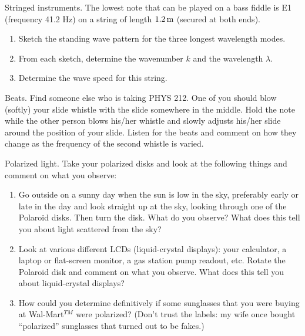 \begin{aproblem}{Stringed instruments.} 
  The lowest note that can be played on a bass fiddle is E1 (frequency
  41.2 Hz) on a string of length $1.2\,\mbox{m}$ (secured at both
  ends).
  \begin{enumerate}
  \item Sketch the standing wave pattern for the three longest
    wavelength modes.
  \item From each sketch, determine the wavenumber $k$ and the
    wavelength $\lambda$.
  \item Determine the wave speed for this string.
  \end{enumerate}
\end{aproblem}

\begin{aproblem}{Beats.}  
  Find someone else who is taking PHYS 212. One of you should blow
  (softly) your slide whistle with the slide somewhere in the
  middle. Hold the note while the other person blows his/her whistle
  and slowly adjusts his/her slide around the position of your slide.
  Listen for the beats and comment on how they change as the frequency
  of the second whistle is varied.
\end{aproblem}


\begin{aproblem}{Polarized light.}  
  Take your polarized disks and look at the following things and
  comment on what you observe:
  \begin{enumerate}
  \item Go outside on a sunny day when the sun is low in the sky,
    preferably early or late in the day and look straight up at the
    sky, looking through one of the Polaroid disks.  Then turn the
    disk.  What do you observe?  What does this tell you about light
    scattered from the sky?
  \item Look at various different LCDs (liquid-crystal displays): your
    calculator, a laptop or flat-screen monitor, a gas station pump
    readout, etc.  Rotate the Polaroid disk and comment on what you
    observe.  What does this tell you about liquid-crystal displays?
  \item How could you determine definitively if some sunglasses that
    you were buying at Wal-Mart$^{TM}$ were polarized?  (Don't trust
    the labels: my wife once bought ``polarized'' sunglasses that
    turned out to be fakes.)
  \end{enumerate}
\end{aproblem}

